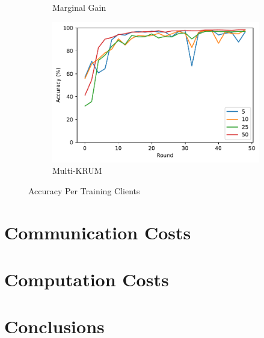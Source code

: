 \begin{figure}[!ht]
\begin{subfigure}[b]{0.49\textwidth}
        \caption{Marginal Gain}
    \end{subfigure}
    \hfill
    \begin{subfigure}[b]{0.49\textwidth}
        \centering
        \includegraphics[width=\textwidth]{graphics/clients/accuracy_multikrum.pdf}
        \caption{Multi-KRUM}
    \end{subfigure}
    \caption{Accuracy Per Training Clients}
    \label{fig:clients_accuracy}
\end{figure}


\section{Communication Costs}


\section{Computation Costs}


\section{Conclusions} %

\clearpage

